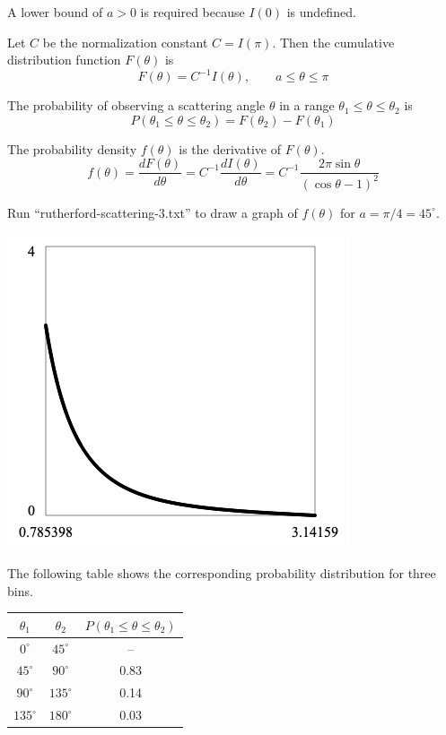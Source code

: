 \documentclass[12pt]{article}
\begin{document}
\noindent
A lower bound of $a>0$ is required because $I(0)$ is undefined.

\bigskip
\noindent
Let $C$ be the normalization constant $C=I(\pi)$.
Then the cumulative distribution function $F(\theta)$ is
\begin{equation*}
F(\theta)=C^{-1}I(\theta),
\qquad a\le\theta\le\pi
\end{equation*}

\noindent
The probability of observing a scattering angle $\theta$ in a range $\theta_1\le\theta\le\theta_2$ is
\begin{equation*}
P(\theta_1\le\theta\le\theta_2)=F(\theta_2)-F(\theta_1)
\end{equation*}

\noindent
The probability density $f(\theta)$ is the derivative of $F(\theta)$.
\begin{equation*}
f(\theta)=\frac{dF(\theta)}{d\theta}=C^{-1}\frac{dI(\theta)}{d\theta}
=C^{-1}\frac{2\pi\sin\theta}{(\cos\theta-1)^2}
\end{equation*}

\noindent
Run ``rutherford-scattering-3.txt'' to draw a graph of $f(\theta)$ for $a=\pi/4=45^\circ$.

\begin{center}
\includegraphics[scale=0.5]{rutherford-scattering-1.png}
\end{center}

\noindent
The following table shows the corresponding probability distribution for three bins.

\begin{center}
\begin{tabular}{|c|c|c|}
\hline
$\theta_1$ & $\theta_2$ & $P(\theta_1\le\theta\le\theta_2)$\\
\hline
$0^\circ$ & $45^\circ$ & -- \\
$45^\circ$ & $90^\circ$ & 0.83 \\
$90^\circ$ & $135^\circ$ & 0.14 \\
$135^\circ$ & $180^\circ$ & 0.03 \\
\hline
\end{tabular}
\end{center}
\end{document}
